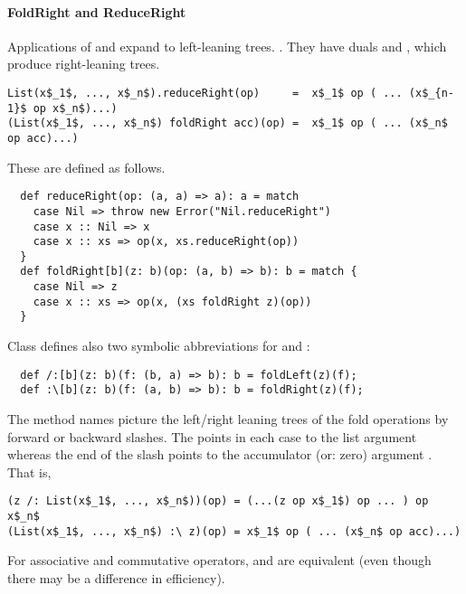 \paragraph{FoldRight and ReduceRight}
Applications of  and  expand to
left-leaning trees. .  They have duals
 and , which produce right-leaning
trees.
\begin{lstlisting}
List(x$_1$, ..., x$_n$).reduceRight(op)     =  x$_1$ op ( ... (x$_{n-1}$ op x$_n$)...)
(List(x$_1$, ..., x$_n$) foldRight acc)(op) =  x$_1$ op ( ... (x$_n$ op acc)...)
\end{lstlisting}
These are defined as follows.
\begin{lstlisting}
  def reduceRight(op: (a, a) => a): a = match 
    case Nil => throw new Error("Nil.reduceRight")
    case x :: Nil => x
    case x :: xs => op(x, xs.reduceRight(op))
  }
  def foldRight[b](z: b)(op: (a, b) => b): b = match {
    case Nil => z
    case x :: xs => op(x, (xs foldRight z)(op))
  }
\end{lstlisting}

Class  defines also two symbolic abbreviations for
 and :
\begin{lstlisting}
  def /:[b](z: b)(f: (b, a) => b): b = foldLeft(z)(f);
  def :\[b](z: b)(f: (a, b) => b): b = foldRight(z)(f);
\end{lstlisting}
The method names picture the left/right leaning trees of the fold
operations by forward or backward slashes. The \code{:} points in each
case to the list argument whereas the end of the slash points to the
accumulator (or: zero) argument . 
That is, 
\begin{lstlisting}
(z /: List(x$_1$, ..., x$_n$))(op) = (...(z op x$_1$) op ... ) op x$_n$ 
(List(x$_1$, ..., x$_n$) :\ z)(op) = x$_1$ op ( ... (x$_n$ op acc)...)
\end{lstlisting}
For associative and commutative operators, \code{/:} and
\code{:\\} are equivalent (even though there may be a difference
in efficiency).  

